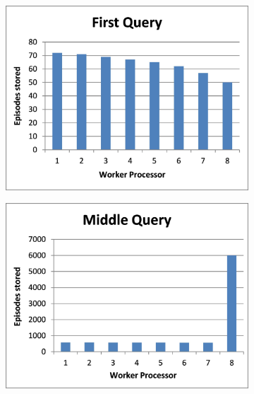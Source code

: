 \documentclass[11pt]{article} %
\begin{document}
\begin{figure}
        \centering
        \begin{subfigure}[b]{0.33\textwidth}
                \centering
                \includegraphics[width=\textwidth]{images/firstquery2}
                \label{fig:shortdynam1}
        \end{subfigure}%
        \begin{subfigure}[b]{0.33\textwidth}
                \centering
                \includegraphics[width=\textwidth]{images/shortmiddlequery}
                \label{fig:shortdynam2}

\end{subfigure}
\end{figure}
\end{document}
